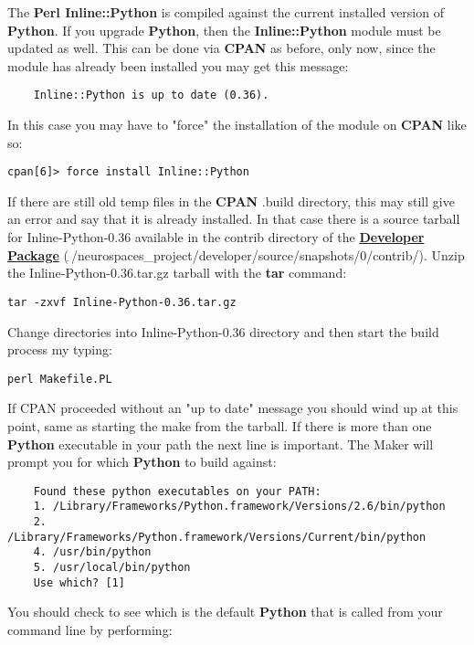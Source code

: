 \documentclass[12pt]{article}
\begin{document}
The {\bf Perl Inline::Python} is compiled against the current installed version of {\bf Python}. If you upgrade {\bf Python}, then the {\bf Inline::Python} module must be updated as well. This can be done via {\bf CPAN} as before, only now, since the module has already been installed you may get this message:

\begin{verbatim}
	Inline::Python is up to date (0.36).
\end{verbatim}

In this case you may have to "force" the installation of the module on {\bf CPAN} like so:

\begin{verbatim}
cpan[6]> force install Inline::Python
\end{verbatim}

If there are still old temp files in the {\bf CPAN} .build directory, this may still give an error and say that it is already installed. In that case there is a source tarball for Inline-Python-0.36 available in the contrib directory of the \href{../developer-package/developer-package.tex}{\bf Developer Package} ($_{\widetilde{~}}$/neurospaces\_project/developer/source/snapshots/0/contrib/). Unzip the Inline-Python-0.36.tar.gz tarball with the {\bf tar} command:

\begin{verbatim}
tar -zxvf Inline-Python-0.36.tar.gz
\end{verbatim}

Change directories into Inline-Python-0.36 directory and then start the build process my typing:

\begin{verbatim}
perl Makefile.PL
\end{verbatim}

If CPAN proceeded without an "up to date" message you should wind up at this point, same as starting the make from the tarball. If there is more than one {\bf Python} executable in your path the next line is important. The Maker will prompt you for which {\bf Python} to build against:

\begin{verbatim}
	Found these python executables on your PATH:
	1. /Library/Frameworks/Python.framework/Versions/2.6/bin/python
	2. /Library/Frameworks/Python.framework/Versions/Current/bin/python
	4. /usr/bin/python
	5. /usr/local/bin/python
	Use which? [1] 
\end{verbatim}

You should check to see which is the default {\bf Python} that is called from your command line by performing:
\end{document}
